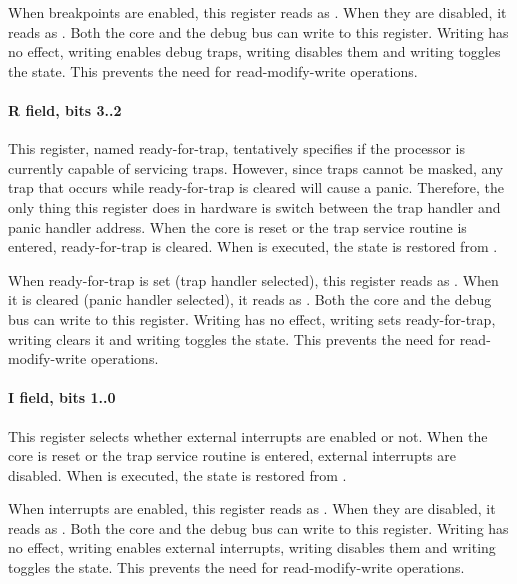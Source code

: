 When breakpoints are enabled, this register reads as . When they are
disabled, it reads as . Both the core and the debug bus can write to
this register. Writing  has no effect, writing  enables debug
traps, writing  disables them and writing  toggles the state.
This prevents the need for read-modify-write operations.
\paragraph*{R field, bits 3..2}
This register, named ready-for-trap, tentatively specifies if the processor is
currently capable of servicing traps. However, since traps cannot be masked,
any trap that occurs while ready-for-trap is cleared will cause a panic.
Therefore, the only thing this register does in hardware is switch between the
trap handler and panic handler address. When the core is reset or the trap
service routine is entered, ready-for-trap is cleared. When  is
executed, the state is restored from .

When ready-for-trap is set (trap handler selected), this register reads as
. When it is cleared (panic handler selected), it reads as .
Both the core and the debug bus can write to this register. Writing 
has no effect, writing  sets ready-for-trap, writing  clears
it and writing  toggles the state. This prevents the need for
read-modify-write operations.
\paragraph*{I field, bits 1..0}
This register selects whether external interrupts are enabled or not. When the
core is reset or the trap service routine is entered, external interrupts are
disabled. When  is executed, the state is restored from .

When interrupts are enabled, this register reads as . When they are
disabled, it reads as . Both the core and the debug bus can write to
this register. Writing  has no effect, writing  enables
external interrupts, writing  disables them and writing 
toggles the state. This prevents the need for read-modify-write operations.
